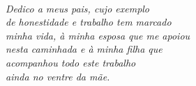 \ 

\vfill

\begin{flushright}
\hfill \textit{Dedico a meus pais, cujo exemplo\\ de honestidade e trabalho tem marcado\\ minha vida, à minha esposa que me apoiou\\nesta caminhada e à minha filha que\\ acompanhou todo este trabalho\\ ainda no ventre da mãe.}
\end{flushright}

\vspace*{1cm}

\clearpage
